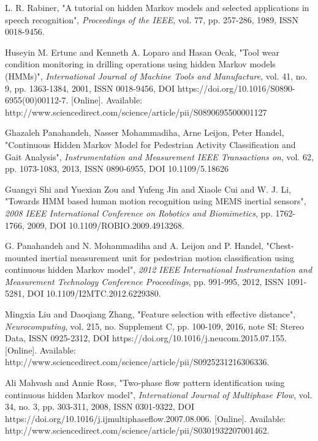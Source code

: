 

\begin{thebibliography}{5}
	
 L. R. Rabiner, "A tutorial on hidden Markov models and selected applications in speech recognition", \emph{Proceedings of the IEEE}, vol. 77, pp. 257-286, 1989, ISSN 0018-9456.

 Huseyin M. Ertunc and Kenneth A. Loparo and Hasan Ocak, "Tool wear condition monitoring in drilling operations using hidden Markov models (HMMs)", \emph{International Journal of Machine Tools and Manufacture}, vol. 41, no. 9, pp. 1363-1384, 2001, ISSN 0018-9456, DOI https://doi.org/10.1016/S0890-6955(00)00112-7. [Online]. Available:  http://www.sciencedirect.com/science/article/pii/S0890695500001127

 Ghazaleh Panahandeh, Nasser Mohammadiha, Arne Leijon, Peter Handel, "Continuous Hidden Markov Model for Pedestrian Activity Classification and Gait Analysis", \emph{Instrumentation and Measurement IEEE Transactions on}, vol. 62, pp. 1073-1083, 2013, ISSN 0890-6955, DOI 10.1109/5.18626

 Guangyi Shi and Yuexian Zou and Yufeng Jin and Xiaole Cui and W. J. Li, "Towards HMM based human motion recognition using MEMS inertial sensors", \emph{2008 IEEE International Conference on Robotics and Biomimetics}, pp. 1762-1766, 2009, DOI 10.1109/ROBIO.2009.4913268.

 G. Panahandeh and N. Mohammadiha and A. Leijon and P. Handel, "Chest-mounted inertial measurement unit for pedestrian motion classification using continuous hidden Markov model", \emph{2012 IEEE International Instrumentation and Measurement Technology Conference Proceedings}, pp. 991-995, 2012, ISSN 1091-5281, DOI 10.1109/I2MTC.2012.6229380.

 Mingxia Liu and Daoqiang Zhang, "Feature selection with effective distance", \emph{Neurocomputing}, vol. 215, no. Supplement C, pp. 100-109, 2016, note SI: Stereo Data, ISSN 0925-2312, DOI https://doi.org/10.1016/j.neucom.2015.07.155. [Online]. Available: http://www.sciencedirect.com/science/article/pii/S0925231216306336. 

 Ali Mahvash and Annie Ross, "Two-phase flow pattern identification using continuous hidden Markov model", \emph{International Journal of Multiphase Flow}, vol. 34, no. 3, pp. 303-311, 2008, ISSN 0301-9322, DOI https://doi.org/10.1016/j.ijmultiphaseflow.2007.08.006. [Online]. Available: http://www.sciencedirect.com/science/article/pii/S0301932207001462. 


\end{thebibliography}
